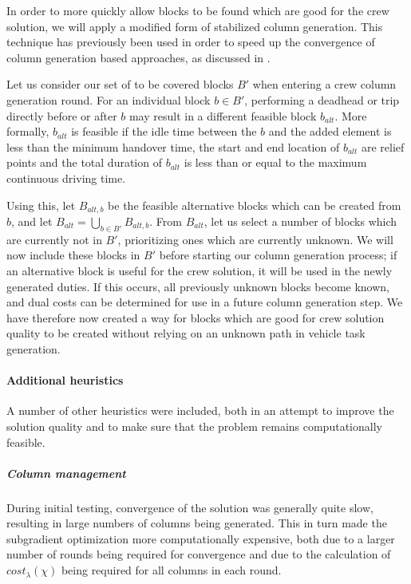 \documentclass[]{article}
\begin{document}
In order to more quickly allow blocks to be found which are good for the crew solution, we will apply a modified form of stabilized column generation. This technique has previously been used in order to speed up the convergence of column generation based approaches, as discussed in \citet{DuMerle1999}. 

Let us consider our set of to be covered blocks $B'$ when entering a crew column generation round. For an individual block $b \in B'$, performing a deadhead or trip directly before or after $b$ may result in a different feasible block $b_{alt}$. More formally, $b_{alt}$ is feasible if the idle time between the $b$ and the added element is less than the minimum handover time, the start and end location of $b_{alt}$ are relief points and the total duration of $b_{alt}$ is less than or equal to the maximum continuous driving time.

Using this, let $B_{alt,b}$ be the feasible alternative blocks which can be created from $b$, and let $B_{alt} = \bigcup_{b \in B'} B_{alt,b}$. From $B_{alt}$, let us select a number of blocks which are currently not in $B'$, prioritizing ones which are currently unknown. We will now include these blocks in $B'$ before starting our column generation process; if an alternative block is useful for the crew solution, it will be used in the newly generated duties. If this occurs, all previously unknown blocks become known, and dual costs can be determined for use in a future column  generation step. We have therefore now created a way for blocks which are good for crew solution quality to be created without relying on an unknown path in vehicle task generation.

\paragraph{Additional heuristics}
A number of other heuristics were included, both in an attempt to improve the solution quality and to make sure that the problem remains computationally feasible.

\subparagraph{Column management} During initial testing, convergence of the solution was generally quite slow, resulting in large numbers of columns being generated. This in turn made the subgradient optimization more computationally expensive, both due to a larger number of rounds being required for convergence and due to the calculation of $cost_\lambda(\chi)$ being required for all columns in each round. 
\end{document}
